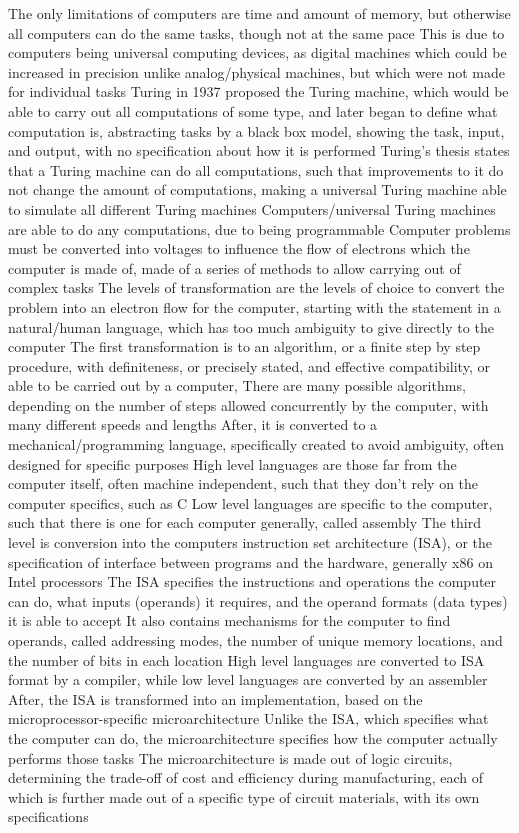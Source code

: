 \documentclass[11 pt, twoside]{article}
\newenvironment{outline*}
{
	\begin{outline}[enumerate]
	}
	{\end{outline}
}
\begin{document}
\begin{outline*}
\1 The only limitations of computers are time and amount of memory, but otherwise all computers can do the same tasks, though not at the same pace
\2 This is due to computers being universal computing devices, as digital machines which could be increased in precision unlike analog/physical machines, but which were not made for individual tasks
\2 Turing in 1937 proposed the Turing machine, which would be able to carry out all computations of some type, and later began to define what computation is, abstracting tasks by a black box model, showing the task, input, and output, with no specification about how it is performed
\3 Turing's thesis states that a Turing machine can do all computations, such that improvements to it do not change the amount of computations, making a universal Turing machine able to simulate all different Turing machines
\2 Computers/universal Turing machines are able to do any computations, due to being programmable
\1 Computer problems must be converted into voltages to influence the flow of electrons which the computer is made of, made of a series of methods to allow carrying out of complex tasks
\2 The levels of transformation are the levels of choice to convert the problem into an electron flow for the computer, starting with the statement in a natural/human language, which has too much ambiguity to give directly to the computer
\2 The first transformation is to an algorithm, or a finite step by step procedure, with definiteness, or precisely stated, and effective compatibility, or able to be carried out by a computer,
\3 There are many possible algorithms, depending on the number of steps allowed concurrently by the computer, with many different speeds and lengths
\2 After, it is converted to a mechanical/programming language, specifically created to avoid ambiguity, often designed for specific purposes
\3 High level languages are those far from the computer itself, often machine independent, such that they don't rely on the computer specifics, such as C
\3 Low level languages are specific to the computer, such that there is one for each computer generally, called assembly
\2 The third level is conversion into the computers instruction set architecture (ISA), or the specification of interface between programs and the hardware, generally x86 on Intel processors
\3 The ISA specifies the instructions and operations the computer can do, what inputs (operands) it requires, and the operand formats (data types) it is able to accept
\3 It also contains mechanisms for the computer to find operands, called addressing modes, the number of unique memory locations, and the number of bits in each location
\3 High level languages are converted to ISA format by a compiler, while low level languages are converted by an assembler
\2 After, the ISA is transformed into an implementation, based on the microprocessor-specific microarchitecture
\3 Unlike the ISA, which specifies what the computer can do, the microarchitecture specifies how the computer actually performs those tasks
\2 The microarchitecture is made out of logic circuits, determining the trade-off of cost and efficiency during manufacturing, each of which is further made out of a specific type of circuit materials, with its own specifications
\end{outline*}
\end{document}
